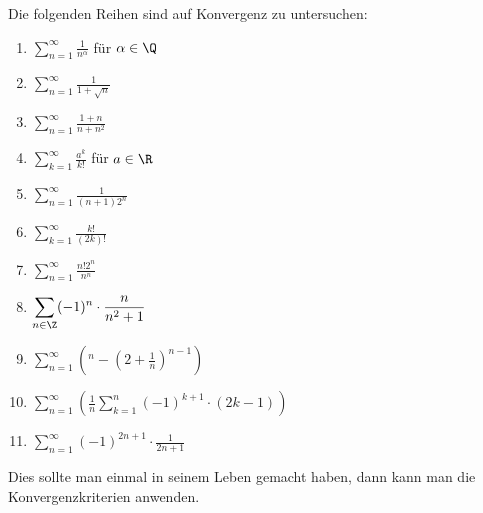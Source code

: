 \begin{exercise}
  Die folgenden Reihen sind auf Konvergenz zu untersuchen:
  \begin{enumerate}[label=(\alph*)]
  \item $\displaystyle \sum_{n = 1}^\infty \frac{1}{n^\alpha}$ für $\alpha \in \Q$
  \item $\displaystyle \sum_{n = 1}^\infty \frac{1}{1 + \sqrt{n}}$
  \item $\displaystyle \sum_{n = 1}^\infty \frac{1+n}{n+n^2}$
  \item $\displaystyle \sum_{k = 1}^\infty \frac{a^k}{k!}$ für $a \in \R$
  \item $\displaystyle \sum_{n = 1}^\infty \frac{1}{(n+1)2^n}$
  \item $\displaystyle \sum_{k = 1}^\infty \frac{k!}{\left( 2k \right)!}$
  \item $\displaystyle \sum_{n = 1}^\infty \frac{n! 2^n}{n^n}$
  \item $\displaystyle \sum_{n \in \Z} (-1)^n \cdot \frac{n }{n^2 + 1}$
  \item $\displaystyle \sum_{n = 1}^\infty \left(^n - \left( 2+\frac{1}{n} \right)^{n-1} \right)$
  \item $\displaystyle \sum_{n = 1}^\infty \left( \frac{1}{n} \sum_{k = 1}^n (-1)^{k+1} \cdot (2k-1) \right)$
  \item $\displaystyle \sum_{n = 1}^\infty (-1)^{2n+1}\cdot \frac{1}{2n+1}$
  \end{enumerate}
  Dies sollte man einmal in seinem Leben gemacht haben, dann kann man die
  Konvergenzkriterien anwenden.
\end{exercise}
